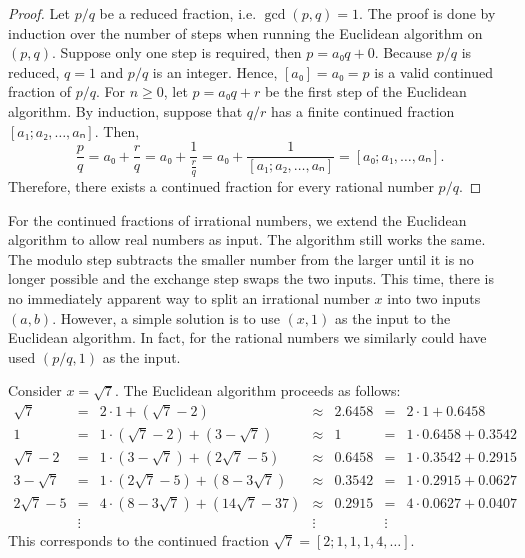 \begin{proof}
  Let $p/q$ be a reduced fraction, i.e. $\gcd(p, q) = 1$.
  The proof is done by induction over the number of steps when running the
  Euclidean algorithm on $(p, q)$.
  Suppose only one step is required, then $p = a₀ q + 0$.
  Because $p/q$ is reduced, $q = 1$ and $p/q$ is an integer.
  Hence, $[a₀] = a₀ = p$ is a valid continued fraction of $p/q$.
  For $n ≥ 0$, let $p = a₀ q + r$ be the first step of the Euclidean algorithm.
  By induction, suppose that $q/r$ has a finite continued fraction $[a₁; a₂, …, aₙ]$.
  Then,
  \[
    \frac{p}{q}
    = a₀ + \frac{r}{q}
    = a₀ + \frac{1}{\frac{r}{q}}
    = a₀ + \frac{1}{[a₁; a₂, …, aₙ]}
    = [a₀; a₁, …, aₙ].
  \]
  Therefore, there exists a continued fraction for every rational number $p/q$.
\end{proof}

For the continued fractions of irrational numbers,
we extend the Euclidean algorithm to allow real numbers as input.
The algorithm still works the same.
The modulo step subtracts the smaller number from the larger until it is no
longer possible and the exchange step swaps the two inputs.
This time, there is no immediately apparent way to split an irrational number
$x$ into two inputs $(a, b)$.
However, a simple solution is to use $(x, 1)$ as the input to the Euclidean
algorithm.
In fact, for the rational numbers we similarly could have used $(p/q, 1)$ as
the input.

\begin{example}
  Consider $x = \sqrt{7}$.
  The Euclidean algorithm proceeds as follows:
  \[
    \begin{array}{rclcrcl}
      \sqrt{7}      & = & 2 · 1               + (\sqrt{7} - 2)    & ≈ & 2.6458 & = & 2 · 1 + 0.6458      \\
      1             & = & 1 · (\sqrt{7} - 2)  + (3 - \sqrt{7})    & ≈ & 1      & = & 1 · 0.6458 + 0.3542 \\
      \sqrt{7} - 2  & = & 1 · (3 - \sqrt{7})  + (2\sqrt{7} - 5)   & ≈ & 0.6458 & = & 1 · 0.3542 + 0.2915 \\
      3 - \sqrt{7}  & = & 1 · (2\sqrt{7} - 5) + (8 - 3\sqrt{7})   & ≈ & 0.3542 & = & 1 · 0.2915 + 0.0627 \\
      2\sqrt{7} - 5 & = & 4 · (8 - 3\sqrt{7}) + (14\sqrt{7} - 37) & ≈ & 0.2915 & = & 4 · 0.0627 + 0.0407 \\
                    & ⋮ &                                         & ⋮ &        & ⋮ &
    \end{array}
  \]
  This corresponds to the continued fraction $\sqrt{7} = [2; 1, 1, 1, 4, …]$.
\end{example}


